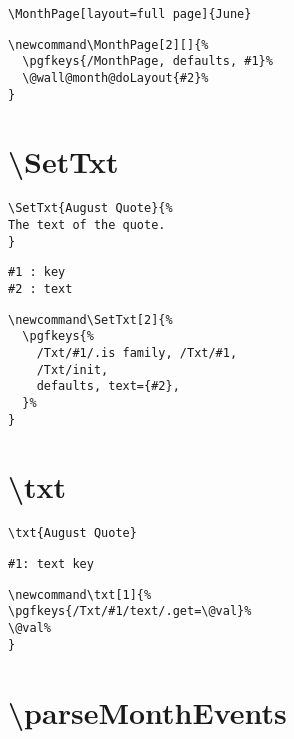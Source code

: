 \documentclass[11pt,oneside]{memoir-article}
\begin{document}
\begin{verbatim}
\MonthPage[layout=full page]{June}
\end{verbatim}

\begin{verbatim}
\newcommand\MonthPage[2][]{%
  \pgfkeys{/MonthPage, defaults, #1}%
  \@wall@month@doLayout{#2}%
}
\end{verbatim}

\section{\textbackslash SetTxt}
\label{sec:org5f9e367}

\begin{verbatim}
\SetTxt{August Quote}{%
The text of the quote.
}
\end{verbatim}

\begin{verbatim}
#1 : key
#2 : text
\end{verbatim}

\begin{verbatim}
\newcommand\SetTxt[2]{%
  \pgfkeys{%
    /Txt/#1/.is family, /Txt/#1,
    /Txt/init,
    defaults, text={#2},
  }%
}
\end{verbatim}

\section{\textbackslash txt}
\label{sec:org396a316}

\begin{verbatim}
\txt{August Quote}
\end{verbatim}

\begin{verbatim}
#1: text key
\end{verbatim}

\begin{verbatim}
\newcommand\txt[1]{%
\pgfkeys{/Txt/#1/text/.get=\@val}%
\@val%
}
\end{verbatim}

\section{\textbackslash parseMonthEvents}
\label{sec:org3b370cc}
\end{document}
